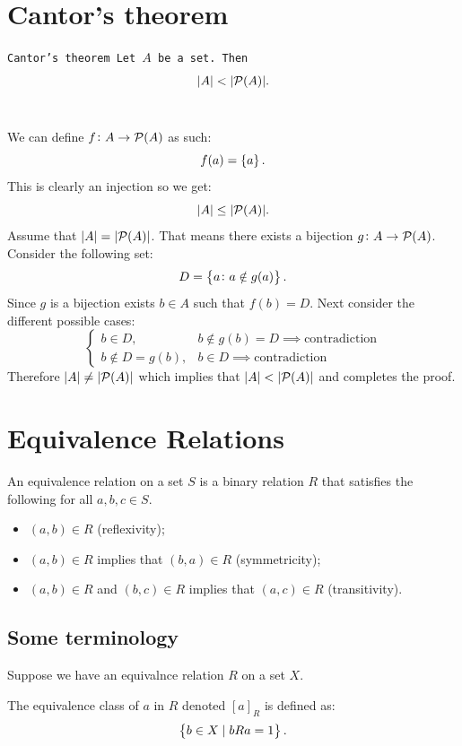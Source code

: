 \documentclass[11pt,a4paper]{article}
\begin{document}
	\section{Cantor's theorem}
  \begin{theorem}\tt{Cantor's theorem}
	Let $A$ be a set. Then
	\[
		|A| < |\mathcal{P}(A)|.
	\]
	\end{theorem}
	\noindent We can define $f \colon A \to \mathcal{P}(A)$ as such:
	\[
		f(a) = \set{a}.
	\]
	This is clearly an injection so we get:
	\[
		 |A| \le |\mathcal{P}(A)|.
	\]
	Assume that $|A| = |\mathcal{P}(A)|$. 
	That means there exists a bijection $g \colon A \to \mathcal{P}(A)$.
  Consider the following set:
	\[
		D = \set{a \colon a \notin g(a)}.
	\]
	Since $g$ is a bijection exists $b \in A$ such that $f(b) = D$.
  Next consider the different possible cases:
	\[
		\begin{cases}
		b\in D, & b\notin g(b)=D \implies \text{contradiction} \\
		b\notin D=g(b), & b\in D \implies \text{contradiction}
		\end{cases}
	\]
	Therefore $|A| \neq |\mathcal{P}(A)|$ which implies that 
  $|A| < |\mathcal{P}(A)|$ and completes the proof.
		
\newpage
	\section{Equivalence Relations}
  \begin{definition}
	An equivalence relation on a set $S$ is a binary relation $R$ that 
  satisfies the following for all $a,b,c \in S$.
	\begin{itemize}
	\item $(a,b) \in R$ (reflexivity);
	\item $(a,b) \in R$ implies that $(b,a) \in R$ (symmetricity);
	\item $(a,b) \in R$ and $(b,c) \in R$ implies that $(a,c) \in R$
    (transitivity).
	\end{itemize}
  \end{definition}
	
	\subsection{Some terminology}
		
    Suppose we have an equivalnce relation $R$ on a set $X$.

    \begin{definition}
			The equivalence class of $a$ in $R$ denoted $[a]_R$ is defined as:
			\[
        \set{b \in X \mid bRa = 1}.
			\]
		\end{definition}
\end{document}
